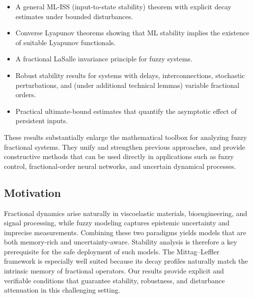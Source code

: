 \documentclass[11pt,a4paper]{article}
\theoremstyle{plain}
\theoremstyle{definition}
\theoremstyle{remark}
\begin{document}
	\begin{itemize}
		\item A general ML-ISS (input-to-state stability) theorem with explicit decay estimates under bounded disturbances.
		\item Converse Lyapunov theorems showing that ML stability implies the existence of suitable Lyapunov functionals.
		\item A fractional LaSalle invariance principle for fuzzy systems.
		\item Robust stability results for systems with delays, interconnections, stochastic perturbations, and (under additional technical lemmas) variable fractional orders.
		\item Practical ultimate-bound estimates that quantify the asymptotic effect of persistent inputs.
	\end{itemize}
	
	These results substantially enlarge the mathematical toolbox for analyzing fuzzy fractional systems. They unify and strengthen previous approaches, and provide constructive methods that can be used directly in applications such as fuzzy control, fractional-order neural networks, and uncertain dynamical processes.
	
	\subsection*{Motivation}
	Fractional dynamics arise naturally in viscoelastic materials, bioengineering, and signal processing, while fuzzy modeling captures epistemic uncertainty and imprecise measurements. Combining these two paradigms yields models that are both memory-rich and uncertainty-aware. Stability analysis is therefore a key prerequisite for the safe deployment of such models. The Mittag--Leffler framework is especially well suited because its decay profiles naturally match the intrinsic memory of fractional operators. Our results provide explicit and verifiable conditions that guarantee stability, robustness, and disturbance attenuation in this challenging setting.
	
\end{document}
